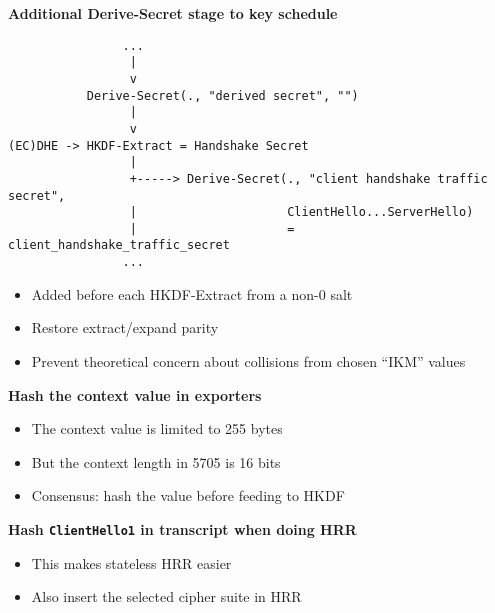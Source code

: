 \documentclass[helvetica]{seminar}
\newcommand{\heading}[1]{%
  \begin{center} 
    \large\bf 
    #1 
  \end{center} 
  \vspace{.4 in}}
\begin{document}
\begin{slide}
\heading{Additional Derive-Secret stage to key schedule}

{\scriptsize
\begin{verbatim}
                ...
                 |
                 v
           Derive-Secret(., "derived secret", "")
                 |
                 v
(EC)DHE -> HKDF-Extract = Handshake Secret
                 |
                 +-----> Derive-Secret(., "client handshake traffic secret",
                 |                     ClientHello...ServerHello)
                 |                     = client_handshake_traffic_secret
                ...
\end{verbatim}
}

\begin{itemize}
\item Added before each HKDF-Extract from a non-0 salt
\item Restore extract/expand parity
\item Prevent theoretical concern about collisions from chosen ``IKM'' values
\end{itemize}
\end{slide}

\begin{slide}
\heading{Hash the context value in exporters}

\begin{itemize}
\item The context value is limited to 255 bytes
\item But the context length in 5705 is 16 bits
\item Consensus: hash the value before feeding to HKDF
\end{itemize}
\end{slide}


\begin{slide}
\heading{Hash \texttt{ClientHello1} in transcript when doing HRR}

\begin{itemize}
\item This makes stateless HRR easier
\item Also insert the selected cipher suite in HRR
\end{itemize}

\end{slide}
\end{document}

